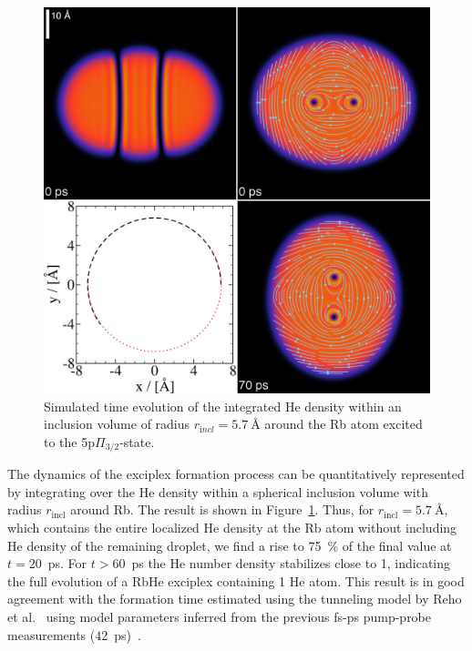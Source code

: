 \begin{figure}[!]
	\includegraphics[width=1.0\linewidth,clip=true]{fig7}
	\caption{\label{fig:inclusion} Simulated time evolution of the integrated He density within an inclusion volume of radius $r_{\mathrm incl}=5.7~$\AA{} around the Rb atom excited to the 5p$\Pi_{3/2}$-state.}
\end{figure}
The dynamics of the exciplex formation process can be quantitatively represented by integrating over the He density within a spherical inclusion volume with radius $r_\mathrm{incl}$ around Rb. The result is shown in Figure~\ref{fig:inclusion}. Thus, for $r_\mathrm{incl}=5.7~$\AA{}, which contains the entire localized He density at the Rb atom without including He density of the remaining droplet, we find a rise to 75~\% of the final value at $t=20$~ps. For $t>60$~ps the He number density stabilizes close to 1, indicating the full evolution of a RbHe exciplex containing 1 He atom. This result is in good agreement with the formation time estimated using the tunneling model by Reho et al.~\cite{Reho2:2000} using model parameters inferred from the previous fs-ps pump-probe measurements ($42$~ps)~\cite{Giese:2012}.

